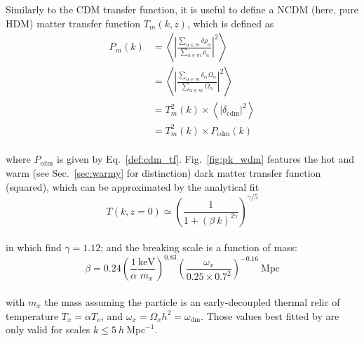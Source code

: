 Similarly to the CDM transfer function, it is useful to define a NCDM (here, pure HDM) matter transfer function $T_m(k, z)$, which is defined as\\
\begin{align}
P_m(k) &= \left\langle \left\vert \frac{\sum\limits_{\alpha \in m} \delta \rho_\alpha}{\sum\limits_{\alpha \in m} \rho_\alpha} \right\vert^2 \right\rangle \\
&= \left\langle \left\vert \frac{\sum\limits_{\alpha \in m} \delta_\alpha \Omega_\alpha}{\sum\limits_{\alpha \in m} \Omega_\alpha} \right\vert^2 \right\rangle \\
&= T^2_m (k) \times \left\langle \left\vert \delta_{\mathrm{cdm}} \right\vert^2 \right\rangle \\
&= T^2_m (k) \times P_{\mathrm{cdm}} (k)
\end{align} \\ where $P_{\mathrm{cdm}}$ is given by Eq.~\ref{def:cdm_tf}. Fig.~\ref{fig:pk_wdm} features the hot and warm (see Sec.~\ref{sec:warmy} for distinction) dark matter transfer function (squared), which can be approximated by the analytical fit \citep{Bode2000}\\
\begin{equation}
\label{eq:fit}
T(k, z=0) \simeq \left( \frac{1}{1 + \left( \beta~k \right)^{2 \gamma}} \right)^{\gamma/5}
\end{equation} \\ in which \cite{VLH08a} find $\gamma = 1.12$; and the breaking scale is a function of mass:\\
\begin{equation}
\beta = 0.24 \left( \frac{1}{\alpha} \frac{\mathrm{keV}}{m_x} \right)^{0.83} \left( \frac{\omega_x}{0.25 \times 0.7^2} \right)^{-0.16}~\mathrm{Mpc}
\end{equation} \\ with $m_x$ the mass assuming the particle is an early-decoupled thermal relic of temperature $T_x = \alpha T_\nu$, and $\omega_x = \Omega_x h^2 = \omega_{\mathrm{dm}}$. Those values best fitted by \cite{VLH08a} are only valid for scales $k \leqslant 5~h~\mathrm{Mpc}^{-1}$. \\

